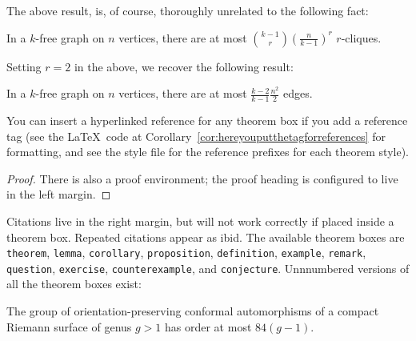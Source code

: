 \documentclass[justified, nofonts, notitlepage, openany, debug, nobib]{tufte-book}
\begin{document}
The above result, is, of course, thoroughly unrelated to the following fact:
\begin{lemma}
    In a $k$-free graph on $n$ vertices, there are at most $\binom{k-1}{r} (\frac{n}{k-1})^r$ $r$-cliques.
\end{lemma}
Setting $r=2$ in the above, we recover the following result:
\begin{corollary}
    In a $k$-free graph on $n$ vertices, there are at most $\frac{k-2}{k-1} \frac{n^2}{2}$ edges. 
\end{corollary}
You can insert a hyperlinked reference for any theorem box if you add a reference tag (see the \LaTeX\ code at Corollary~\ref{cor:hereyouputthetagforreferences} for formatting, and see the style file for the reference prefixes for each theorem style).
\begin{proof}
    There is also a proof environment; the proof heading is configured to live in the left margin.
\end{proof}

Citations live in the right margin\cite[232]{fantechi}, but will not work correctly if placed inside a theorem box. Repeated citations appear as ibid\cite{fantechi}. The available theorem boxes are \texttt{theorem}, \texttt{lemma}, \texttt{corollary}, \texttt{proposition}, \texttt{definition}, \texttt{example}, \texttt{remark}, \texttt{question}, \texttt{exercise}, \texttt{counterexample}, and \texttt{conjecture}. Unnnumbered versions of all the theorem boxes exist:
\begin{proposition*}[Hurwitz]
    The group of orientation-preserving conformal automorphisms of a compact Riemann surface of genus $g > 1$ has order at most $84(g-1)$.
\end{proposition*}

\end{document}

